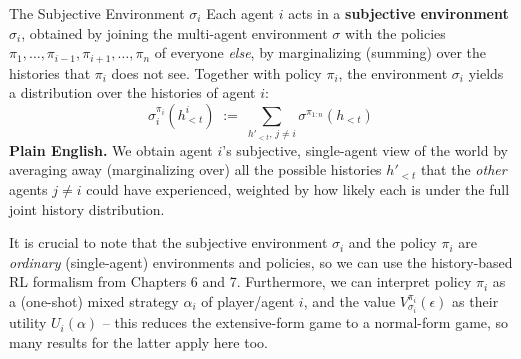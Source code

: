 \documentclass[aspectratio=169,10pt]{beamer}
\begin{document}
\begin{frame}{The Subjective Environment $\sigma_i$}
  Each agent $i$ acts in a \textbf{subjective environment} $\sigma_i$,
  obtained by joining the multi-agent environment $\sigma$ with the
  policies $\pi_1,\ldots,\pi_{i-1},\pi_{i+1},\ldots,\pi_n$ of everyone
  \emph{else}, by marginalizing (summing) over the histories that $\pi_i$
  does not see. Together with policy $\pi_i$, the environment $\sigma_i$
  yields a distribution over the histories of agent $i$:
  \[
    \sigma_i^{\pi_i}(h_{<t}^i) \;:=\; \sum_{h'_{<t},\,j\neq i} \sigma^{\pi_{1:n}}(h_{<t})
  \]
  \textbf{Plain English.} We obtain agent $i$'s subjective, single-agent
  view of the world by averaging away (marginalizing over) all the
  possible histories $h'_{<t}$ that the \emph{other} agents $j\neq i$
  could have experienced, weighted by how likely each is under the full
  joint history distribution.

  \vspace{0.3em}
  It is crucial to note that the subjective environment $\sigma_i$ and the
  policy $\pi_i$ are \emph{ordinary} (single-agent) environments and
  policies, so we can use the history-based RL formalism from Chapters 6
  and 7. Furthermore, we can interpret policy $\pi_i$ as a (one-shot)
  mixed strategy $\alpha_i$ of player/agent $i$, and the value
  $V^{\pi_i}_{\sigma_i}(\epsilon)$ as their utility $U_i(\alpha)$ -- this
  reduces the extensive-form game to a normal-form game, so many results
  for the latter apply here too.
\end{frame}
\end{document}
